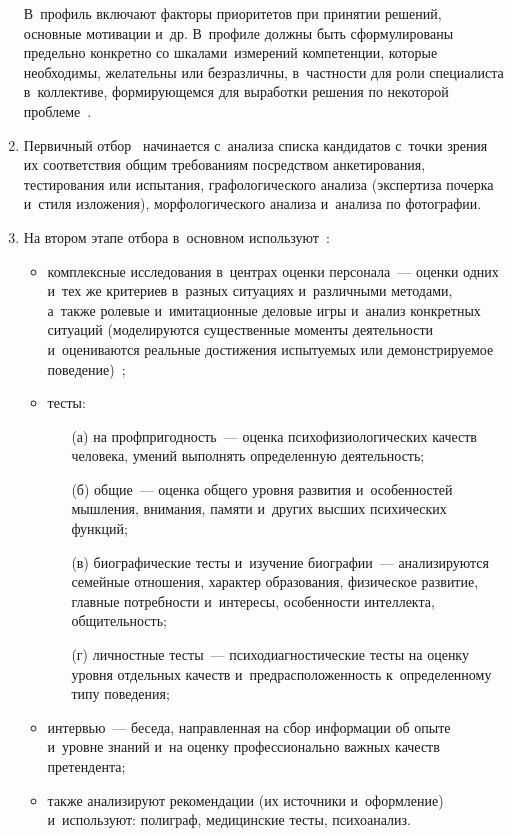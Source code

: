 \begin{multicols}{2}
\begin{enumerate}[1.]
 В~профиль включают факторы 
приоритетов при принятии решений, основные мотивации и~др. В~профиле 
долж\-ны быть сформулированы предельно конкретно со шкалами~измерений 
компетенции, которые необходимы, желательны или безразличны, в~част\-ности 
для роли специалиста в~коллективе, фор\-ми\-ру\-ющем\-ся для выработки решения 
по некоторой проб\-ле\-ме~\cite{6-r, 25-r}.\\[-14pt]
\item Первичный отбор~\cite{7-r} начинается с~анализа спис\-ка кандидатов 
с~точ\-ки зрения их соответствия общим требованиям по\-сред\-ст\-вом 
анкетирования, тес\-ти\-ро\-ва\-ния или испытания, графологического анализа 
(экспертиза почерка и~стиля изложения), морфологического анализа и~анализа 
по фотографии.\\ [-14pt]
\item На втором этапе отбора в~основном используют~\cite{26-r, 27-r}:
\begin{itemize}
\item комплексные исследования в~цент\-рах оценки персонала~--- 
оценки одних и~тех же критериев в~разных ситуациях и~различными методами, а~также 
ролевые и~имитационные деловые игры и~анализ конкретных ситуаций 
(моделируются существенные моменты дея\-тель\-ности и~оцениваются реальные 
достижения ис\-пы\-ту\-емых или де\-монст\-ри\-ру\-емое поведение)~\cite{27-r};\\[-14pt]
\item тесты: 
\begin{itemize}
\item[(а)] на проф\-при\-год\-ность~--- оценка психофизиологических качеств 
человека, умений выполнять определенную дея\-тель\-ность;
\item[(б)] общие~--- оценка 
общего уров\-ня развития и~особенностей мыш\-ле\-ния, внимания, памяти и~других 
высших психических функций; 
\item[(в)] био\-гра\-фи\-че\-ские тес\-ты и~изучение 
био\-гра\-фии~--- анализируются семейные отношения, характер образования, 
физическое развитие, глав\-ные по\-треб\-но\-сти и~интересы, осо\-бен\-но\-сти 
интеллекта, об\-щи\-тель\-ность; 
\item[(г)] личностные тес\-ты~--- психодиагностические 
тес\-ты на оцен\-ку уровня отдельных качеств и~пред\-рас\-по\-ло\-жен\-ность 
к~определенному типу поведения;\\[-14pt]
\end{itemize}
\item интервью~--- беседа, на\-прав\-лен\-ная на сбор информации об опыте 
и~уров\-не знаний и~на оценку профессионально важ\-ных качеств претендента;
\item также анализируют рекомендации (их источники и~оформление) 
и~используют: полиграф, медицинские тес\-ты, психоанализ.\\[-14pt]
\end{itemize}
\end{enumerate}
  

\end{multicols}
